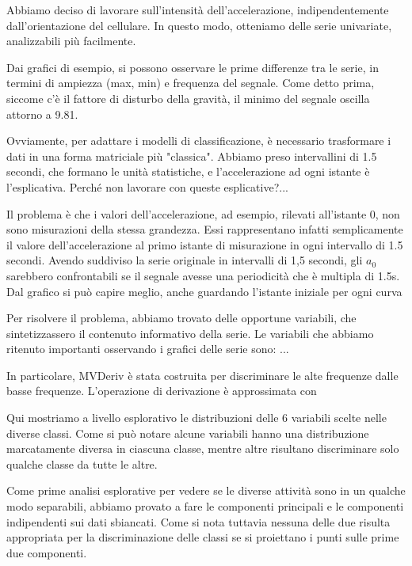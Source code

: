 \documentclass{report}
\begin{document}
%
Abbiamo deciso di lavorare sull'intensità dell'accelerazione, indipendentemente dall'orientazione del cellulare. In questo modo, otteniamo delle serie univariate, analizzabili più facilmente.

Dai grafici di esempio, si possono osservare le prime differenze tra le serie, in termini di ampiezza (max, min) e frequenza del segnale.
Come detto prima, siccome c'è il fattore di disturbo della gravità, il minimo del segnale oscilla attorno a 9.81.
%

%
Ovviamente, per adattare i modelli di classificazione, è necessario trasformare i dati in una forma matriciale più "classica". Abbiamo preso intervallini di 1.5 secondi, che formano le unità statistiche, e l'accelerazione ad ogni istante è l'esplicativa.
Perché non lavorare con queste esplicative?...
%

%
Il problema è che i valori dell\rq{}accelerazione, ad esempio, rilevati all\rq{}istante 0, non sono misurazioni della stessa grandezza. Essi rappresentano infatti semplicamente il valore dell\rq{}accelerazione al primo istante di misurazione in ogni intervallo di 1.5 secondi. Avendo suddiviso la serie originale  in intervalli di 1,5 secondi, gli $a_0$ sarebbero confrontabili se il segnale avesse una periodicità che è multipla di 1.5s.
Dal grafico si può capire meglio, anche guardando l'istante iniziale per ogni curva
%

%
Per risolvere il problema, abbiamo trovato delle opportune variabili, che sintetizzassero il contenuto informativo della serie. Le variabili che abbiamo ritenuto importanti osservando i grafici delle serie sono: ...
%

%
In particolare, MVDeriv è stata costruita per discriminare le alte frequenze dalle basse frequenze. L'operazione di derivazione è approssimata con
%

%
Qui mostriamo a livello esplorativo le distribuzioni delle 6 variabili scelte nelle diverse classi. Come si può notare alcune variabili hanno una distribuzione marcatamente diversa in ciascuna classe, mentre altre risultano discriminare solo qualche classe da tutte le altre.
%

%
Come prime analisi esplorative per vedere se le diverse attività sono in un qualche modo separabili, abbiamo provato a fare le componenti principali e le componenti indipendenti sui dati sbiancati. Come si nota tuttavia nessuna delle due risulta appropriata per la discriminazione delle classi se si proiettano i punti sulle prime due componenti.
%
\end{document}
